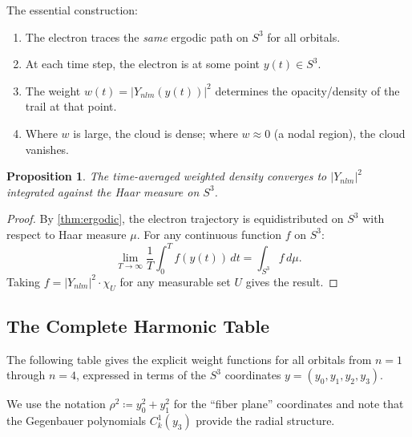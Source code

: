 \documentclass[12pt, a4paper]{article}
\newtheorem{proposition}[theorem]{Proposition}
\theoremstyle{definition}
\theoremstyle{remark}
\newcommand{\Sthree}{S^3}
\begin{document}
The essential construction:
\begin{enumerate}[nosep]
  \item The electron traces the \emph{same} ergodic path on $\Sthree$ for
    all orbitals.
  \item At each time step, the electron is at some point $y(t) \in \Sthree$.
  \item The weight $w(t) = |Y_{nlm}(y(t))|^2$ determines the opacity/density
    of the trail at that point.
  \item Where $w$ is large, the cloud is dense; where $w \approx 0$ (a nodal
    region), the cloud vanishes.
\end{enumerate}

\begin{proposition}
The time-averaged weighted density converges to $|Y_{nlm}|^2$ integrated
against the Haar measure on $\Sthree$.
\end{proposition}

\begin{proof}
By \cref{thm:ergodic}, the electron trajectory is equidistributed on
$\Sthree$ with respect to Haar measure $\mu$. For any continuous
function $f$ on $\Sthree$:
\[
  \lim_{T\to\infty} \frac{1}{T}\int_0^T f(y(t))\,dt
  = \int_{\Sthree} f\,d\mu.
\]
Taking $f = |Y_{nlm}|^2 \cdot \chi_U$ for any measurable set $U$ gives
the result.
\end{proof}

\subsection{The Complete Harmonic Table}

The following table gives the explicit weight functions for all orbitals
from $n=1$ through $n=4$, expressed in terms of the $\Sthree$ coordinates
$y = (y_0, y_1, y_2, y_3)$.

We use the notation $\rho^2 \coloneqq y_0^2 + y_1^2$ for the ``fiber
plane'' coordinates and note that the Gegenbauer polynomials
$C_k^1(y_3)$ provide the radial structure.
\end{document}
